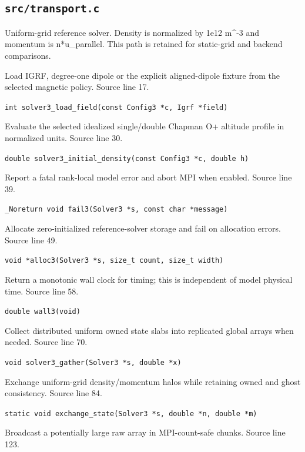 \subsection{\texttt{src/transport.c}}
Uniform-grid reference solver. Density is normalized by 1e12 m\textasciicircum{}-3 and momentum is n*u\_parallel. This path is retained for static-grid and backend comparisons.
\begin{description}[style=nextline,leftmargin=0pt,labelindent=0pt,labelwidth=0pt,labelsep=0pt]
\item[\texttt{solver3\_load\_field}] Load IGRF, degree-one dipole or the explicit aligned-dipole fixture from the selected magnetic policy. Source line 17.\par
{\small\nolinkurl{int solver3_load_field(const Config3 *c, Igrf *field)}}
\item[\texttt{solver3\_initial\_density}] Evaluate the selected idealized single/double Chapman O+ altitude profile in normalized units. Source line 30.\par
{\small\nolinkurl{double solver3_initial_density(const Config3 *c, double h)}}
\item[\texttt{fail3}] Report a fatal rank-local model error and abort MPI when enabled. Source line 39.\par
{\small\nolinkurl{_Noreturn void fail3(Solver3 *s, const char *message)}}
\item[\texttt{alloc3}] Allocate zero-initialized reference-solver storage and fail on allocation errors. Source line 49.\par
{\small\nolinkurl{void *alloc3(Solver3 *s, size_t count, size_t width)}}
\item[\texttt{wall3}] Return a monotonic wall clock for timing; this is independent of model physical time. Source line 58.\par
{\small\nolinkurl{double wall3(void)}}
\item[\texttt{solver3\_gather}] Collect distributed uniform owned state slabs into replicated global arrays when needed. Source line 70.\par
{\small\nolinkurl{void solver3_gather(Solver3 *s, double *x)}}
\item[\texttt{exchange\_state}] Exchange uniform-grid density/momentum halos while retaining owned and ghost consistency. Source line 84.\par
{\small\nolinkurl{static void exchange_state(Solver3 *s, double *n, double *m)}}
\item[\texttt{broadcast}] Broadcast a potentially large raw array in MPI-count-safe chunks. Source line 123.\par

\end{description}

